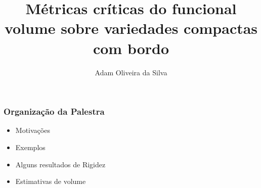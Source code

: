 \documentclass[blue]{beamer}
\title[UFPA]{Métricas críticas do funcional volume sobre variedades compactas com bordo}
\author{Adam Oliveira da Silva}
\institute{Universidade Federal do Pará - UFPA}
\begin{document}
\frame{\titlepage}



\begin{frame}
\centerslidesfalse \frametitle{Organização da Palestra}\pause


\begin{itemize}
	\item Motivações
	\item Exemplos
	\item Alguns resultados de Rigidez
	\item Estimativas de volume
\end{itemize}


\end{frame}












\end{document}
